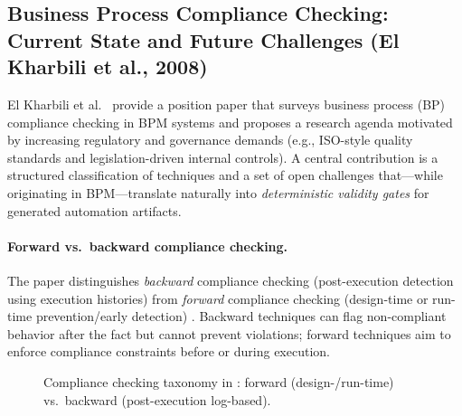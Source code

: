 \subsection{Business Process Compliance Checking: Current State and Future Challenges (El Kharbili et al., 2008)}
\label{subsec:bpcc-kharbili2008}

El Kharbili et al.\ \cite{elkharbili2008bpcc} provide a position paper that surveys business process (BP)
compliance checking in BPM systems and proposes a research agenda motivated by increasing regulatory
and governance demands (e.g., ISO-style quality standards and legislation-driven internal controls).
A central contribution is a structured classification of techniques and a set of open challenges that—while
originating in BPM—translate naturally into \emph{deterministic validity gates} for generated automation artifacts.

\paragraph{Forward vs.\ backward compliance checking.}
The paper distinguishes \emph{backward} compliance checking (post-execution detection using execution histories)
from \emph{forward} compliance checking (design-time or run-time prevention/early detection) \cite{elkharbili2008bpcc}.
Backward techniques can flag non-compliant behavior after the fact but cannot prevent violations; forward techniques
aim to enforce compliance constraints before or during execution.

\begin{figure}[t]
\centering
{}
\caption{Compliance checking taxonomy in \cite{elkharbili2008bpcc}: forward (design-/run-time) vs.\ backward (post-execution log-based).}
\label{fig:bpcc-forward-backward}
\end{figure}

